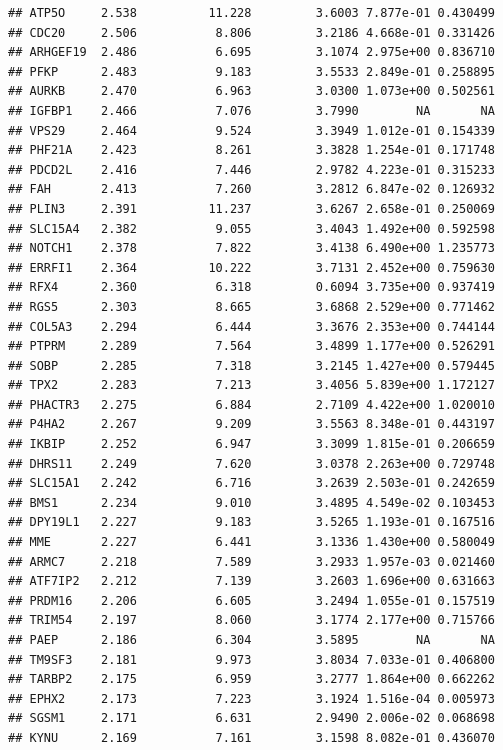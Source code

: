\documentclass{article}\usepackage[]{graphicx}\usepackage[]{color}
\makeatletter
\newenvironment{kframe}{%
 \def\at@end@of@kframe{}%
 \ifinner\ifhmode%
  \def\at@end@of@kframe{\end{minipage}}%
  \begin{minipage}{\columnwidth}%
 \fi\fi%
 \def\FrameCommand##1{\hskip\@totalleftmargin \hskip-\fboxsep
 \colorbox{shadecolor}{##1}\hskip-\fboxsep
     \hskip-\linewidth \hskip-\@totalleftmargin \hskip\columnwidth}%
 \MakeFramed {\advance\hsize-\width
   \@totalleftmargin\z@ \linewidth\hsize
   \@setminipage}}%
 {\par\unskip\endMakeFramed%
 \at@end@of@kframe}
\newenvironment{knitrout}{}{} %
\makeatother
\begin{document}
\begin{knitrout}
\begin{kframe}
\begin{verbatim}
## ATP5O     2.538          11.228         3.6003 7.877e-01 0.430499
## CDC20     2.506           8.806         3.2186 4.668e-01 0.331426
## ARHGEF19  2.486           6.695         3.1074 2.975e+00 0.836710
## PFKP      2.483           9.183         3.5533 2.849e-01 0.258895
## AURKB     2.470           6.963         3.0300 1.073e+00 0.502561
## IGFBP1    2.466           7.076         3.7990        NA       NA
## VPS29     2.464           9.524         3.3949 1.012e-01 0.154339
## PHF21A    2.423           8.261         3.3828 1.254e-01 0.171748
## PDCD2L    2.416           7.446         2.9782 4.223e-01 0.315233
## FAH       2.413           7.260         3.2812 6.847e-02 0.126932
## PLIN3     2.391          11.237         3.6267 2.658e-01 0.250069
## SLC15A4   2.382           9.055         3.4043 1.492e+00 0.592598
## NOTCH1    2.378           7.822         3.4138 6.490e+00 1.235773
## ERRFI1    2.364          10.222         3.7131 2.452e+00 0.759630
## RFX4      2.360           6.318         0.6094 3.735e+00 0.937419
## RGS5      2.303           8.665         3.6868 2.529e+00 0.771462
## COL5A3    2.294           6.444         3.3676 2.353e+00 0.744144
## PTPRM     2.289           7.564         3.4899 1.177e+00 0.526291
## SOBP      2.285           7.318         3.2145 1.427e+00 0.579445
## TPX2      2.283           7.213         3.4056 5.839e+00 1.172127
## PHACTR3   2.275           6.884         2.7109 4.422e+00 1.020010
## P4HA2     2.267           9.209         3.5563 8.348e-01 0.443197
## IKBIP     2.252           6.947         3.3099 1.815e-01 0.206659
## DHRS11    2.249           7.620         3.0378 2.263e+00 0.729748
## SLC15A1   2.242           6.716         3.2639 2.503e-01 0.242659
## BMS1      2.234           9.010         3.4895 4.549e-02 0.103453
## DPY19L1   2.227           9.183         3.5265 1.193e-01 0.167516
## MME       2.227           6.441         3.1336 1.430e+00 0.580049
## ARMC7     2.218           7.589         3.2933 1.957e-03 0.021460
## ATF7IP2   2.212           7.139         3.2603 1.696e+00 0.631663
## PRDM16    2.206           6.605         3.2494 1.055e-01 0.157519
## TRIM54    2.197           8.060         3.1774 2.177e+00 0.715766
## PAEP      2.186           6.304         3.5895        NA       NA
## TM9SF3    2.181           9.973         3.8034 7.033e-01 0.406800
## TARBP2    2.175           6.959         3.2777 1.864e+00 0.662262
## EPHX2     2.173           7.223         3.1924 1.516e-04 0.005973
## SGSM1     2.171           6.631         2.9490 2.006e-02 0.068698
## KYNU      2.169           7.161         3.1598 8.082e-01 0.436070

\end{verbatim}
\end{kframe}
\end{knitrout}
\end{document}
